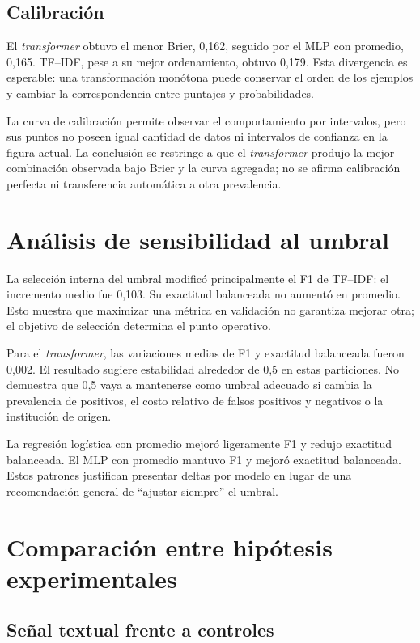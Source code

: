 \subsection{Calibración}

El \textit{transformer} obtuvo el menor Brier, 0,162, seguido por el MLP con promedio, 0,165. TF--IDF, pese a su mejor ordenamiento, obtuvo 0,179. Esta divergencia es esperable: una transformación monótona puede conservar el orden de los ejemplos y cambiar la correspondencia entre puntajes y probabilidades.

La curva de calibración permite observar el comportamiento por intervalos, pero sus puntos no poseen igual cantidad de datos ni intervalos de confianza en la figura actual. La conclusión se restringe a que el \textit{transformer} produjo la mejor combinación observada bajo Brier y la curva agregada; no se afirma calibración perfecta ni transferencia automática a otra prevalencia.

\section{Análisis de sensibilidad al umbral}

La selección interna del umbral modificó principalmente el F1 de TF--IDF: el incremento medio fue 0,103. Su exactitud balanceada no aumentó en promedio. Esto muestra que maximizar una métrica en validación no garantiza mejorar otra; el objetivo de selección determina el punto operativo.

Para el \textit{transformer}, las variaciones medias de F1 y exactitud balanceada fueron 0,002. El resultado sugiere estabilidad alrededor de 0,5 en estas particiones. No demuestra que 0,5 vaya a mantenerse como umbral adecuado si cambia la prevalencia de positivos, el costo relativo de falsos positivos y negativos o la institución de origen.

La regresión logística con promedio mejoró ligeramente F1 y redujo exactitud balanceada. El MLP con promedio mantuvo F1 y mejoró exactitud balanceada. Estos patrones justifican presentar deltas por modelo en lugar de una recomendación general de ``ajustar siempre'' el umbral.

\section{Comparación entre hipótesis experimentales}

\subsection{Señal textual frente a controles}

